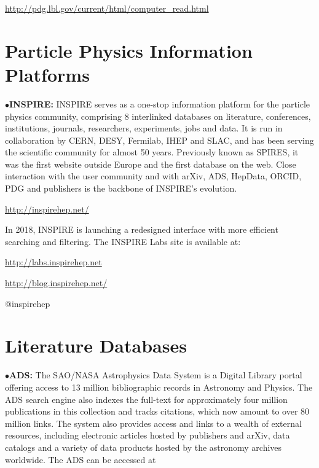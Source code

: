            \item{}\qquad\url{http://pdg.lbl.gov/current/html/computer_read.html}

\section{Particle Physics Information Platforms}%


\item{$\bullet$}{\bf INSPIRE:}
INSPIRE serves as a one-stop information platform for the particle physics community, comprising 8 interlinked databases on literature, conferences, institutions, journals, researchers, experiments, jobs and data. It is run in collaboration by CERN, DESY, Fermilab, IHEP and SLAC, and has been serving the scientific community for almost 50 years. Previously known as SPIRES, it was the first website outside Europe and the first database on the web. Close interaction with the user community and with arXiv, ADS, HepData, ORCID, PDG and publishers is the backbone of INSPIRE's evolution.
	\item{}\qquad\url{http://inspirehep.net/}

\item{}In 2018, INSPIRE is launching a redesigned interface with more efficient searching and filtering. The INSPIRE Labs site is available at:

	\item{}\qquad\url{http://labs.inspirehep.net}
	\item{} \url{http://blog.inspirehep.net/}
	\item{} @inspirehep


\vglue -0.1in
\section{Literature Databases}%

\item{$\bullet$}{\bf ADS:}
The SAO/NASA Astrophysics Data System is a Digital Library portal offering access to 13 million bibliographic records in Astronomy and Physics.  The ADS search engine also indexes the full-text for approximately four million publications in this collection and tracks citations, which now amount to over 80 million links.  The system also provides access and links to a wealth of external resources, including electronic articles hosted by publishers and arXiv, data catalogs and a variety of data products hosted by the astronomy archives worldwide.  The ADS can be accessed at


